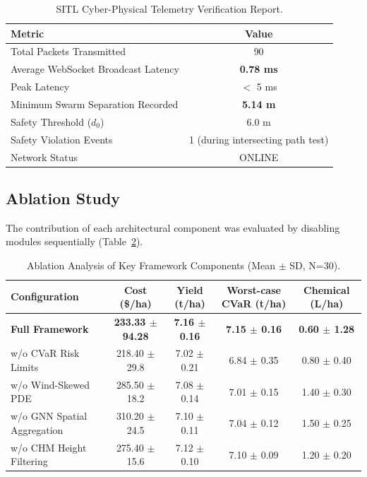 \documentclass[review,3p,times,authoryear]{elsarticle}
\begin{document}
\begin{table}[H]
\centering
\caption{SITL Cyber-Physical Telemetry Verification Report.}
\label{tab:telemetry}
\begin{tabular}{lc}
\toprule
Metric & Value \\
\midrule
Total Packets Transmitted & 90 \\
Average WebSocket Broadcast Latency & \textbf{0.78 ms} \\
Peak Latency & $<$ 5 ms \\
Minimum Swarm Separation Recorded & \textbf{5.14 m} \\
Safety Threshold ($d_0$) & 6.0 m \\
Safety Violation Events & 1 (during intersecting path test) \\
Network Status & ONLINE \\
\bottomrule
\end{tabular}
\end{table}

\subsection{Ablation Study}
The contribution of each architectural component was evaluated by disabling modules sequentially (Table~\ref{tab:ablation}).

\begin{table}[H]
\centering
\caption{Ablation Analysis of Key Framework Components (Mean $\pm$ SD, N=30).}
\label{tab:ablation}
\begin{tabular}{lcccc}
\toprule
Configuration & Cost (\$/ha) & Yield (t/ha) & Worst-case CVaR (t/ha) & Chemical (L/ha) \\
\midrule
\textbf{Full Framework} & \textbf{233.33 $\pm$ 94.28} & \textbf{7.16 $\pm$ 0.16} & \textbf{7.15 $\pm$ 0.16} & \textbf{0.60 $\pm$ 1.28} \\
w/o CVaR Risk Limits & 218.40 $\pm$ 29.8 & 7.02 $\pm$ 0.21 & 6.84 $\pm$ 0.35 & 0.80 $\pm$ 0.40 \\
w/o Wind-Skewed PDE & 285.50 $\pm$ 18.2 & 7.08 $\pm$ 0.14 & 7.01 $\pm$ 0.15 & 1.40 $\pm$ 0.30 \\
w/o GNN Spatial Aggregation & 310.20 $\pm$ 24.5 & 7.10 $\pm$ 0.11 & 7.04 $\pm$ 0.12 & 1.50 $\pm$ 0.25 \\
w/o CHM Height Filtering & 275.40 $\pm$ 15.6 & 7.12 $\pm$ 0.10 & 7.10 $\pm$ 0.09 & 1.20 $\pm$ 0.20 \\
\bottomrule
\end{tabular}
\end{table}
\end{document}

